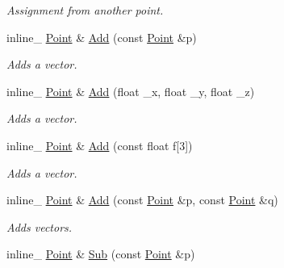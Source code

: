 \begin{DoxyCompactItemize}
\begin{DoxyCompactList}\small\item\em Assignment from another point. \end{DoxyCompactList}\item 
inline\+\_\+ \hyperlink{classOpcode_1_1Point}{Point} \& \hyperlink{classOpcode_1_1Point_ab793dd9740e30aa4bd5ab0f16028ed7a}{Add} (const \hyperlink{classOpcode_1_1Point}{Point} \&p)\hypertarget{classOpcode_1_1Point_ab793dd9740e30aa4bd5ab0f16028ed7a}{}\label{classOpcode_1_1Point_ab793dd9740e30aa4bd5ab0f16028ed7a}

\begin{DoxyCompactList}\small\item\em Adds a vector. \end{DoxyCompactList}\item 
inline\+\_\+ \hyperlink{classOpcode_1_1Point}{Point} \& \hyperlink{classOpcode_1_1Point_aef78ae5090675e4c1685571928d6b510}{Add} (float \+\_\+x, float \+\_\+y, float \+\_\+z)\hypertarget{classOpcode_1_1Point_aef78ae5090675e4c1685571928d6b510}{}\label{classOpcode_1_1Point_aef78ae5090675e4c1685571928d6b510}

\begin{DoxyCompactList}\small\item\em Adds a vector. \end{DoxyCompactList}\item 
inline\+\_\+ \hyperlink{classOpcode_1_1Point}{Point} \& \hyperlink{classOpcode_1_1Point_aa61aba262d91aaac69be5682a41a36ca}{Add} (const float f\mbox{[}3\mbox{]})\hypertarget{classOpcode_1_1Point_aa61aba262d91aaac69be5682a41a36ca}{}\label{classOpcode_1_1Point_aa61aba262d91aaac69be5682a41a36ca}

\begin{DoxyCompactList}\small\item\em Adds a vector. \end{DoxyCompactList}\item 
inline\+\_\+ \hyperlink{classOpcode_1_1Point}{Point} \& \hyperlink{classOpcode_1_1Point_a497868abeaa1185ccc4d13eac19a2a68}{Add} (const \hyperlink{classOpcode_1_1Point}{Point} \&p, const \hyperlink{classOpcode_1_1Point}{Point} \&q)\hypertarget{classOpcode_1_1Point_a497868abeaa1185ccc4d13eac19a2a68}{}\label{classOpcode_1_1Point_a497868abeaa1185ccc4d13eac19a2a68}

\begin{DoxyCompactList}\small\item\em Adds vectors. \end{DoxyCompactList}\item 
inline\+\_\+ \hyperlink{classOpcode_1_1Point}{Point} \& \hyperlink{classOpcode_1_1Point_a432c9a7e1239d5928546149cf606bcb7}{Sub} (const \hyperlink{classOpcode_1_1Point}{Point} \&p)\hypertarget{classOpcode_1_1Point_a432c9a7e1239d5928546149cf606bcb7}{}\label{classOpcode_1_1Point_a432c9a7e1239d5928546149cf606bcb7}


\end{DoxyCompactItemize}
